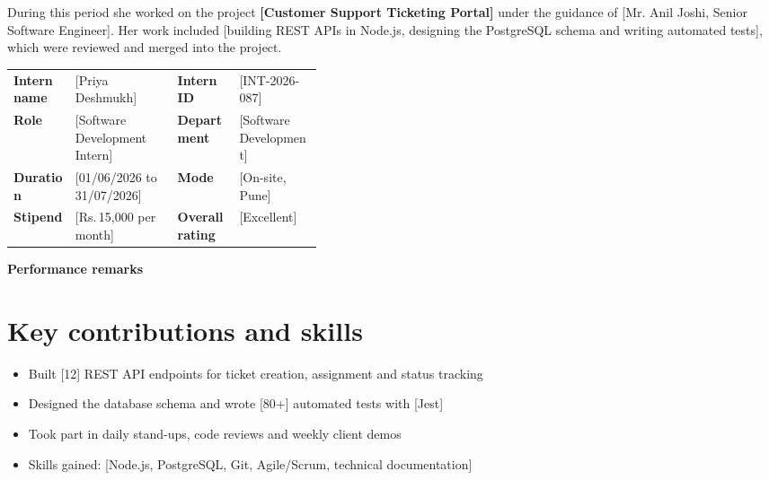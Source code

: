 \documentclass[10pt]{article}
\begin{document}
During this period she worked on the project \textbf{[Customer Support Ticketing Portal]} under the guidance of [Mr. Anil Joshi, Senior Software Engineer]. Her work included [building REST APIs in Node.js, designing the PostgreSQL schema and writing automated tests], which were reviewed and merged into the project.\par\vspace{4pt}

\begin{tabularx}{\linewidth}{@{}p{0.2\linewidth}X p{0.2\linewidth}X@{}}
\textbf{Intern name} & [Priya Deshmukh] & \textbf{Intern ID} & [INT-2026-087] \\
\textbf{Role} & [Software Development Intern] & \textbf{Department} & [Software Development] \\
\textbf{Duration} & [01/06/2026 to 31/07/2026] & \textbf{Mode} & [On-site, Pune] \\
\textbf{Stipend} & [Rs.\,15,000 per month] & \textbf{Overall rating} & [Excellent] \\
\end{tabularx}\par\vspace{2pt}

\noindent\colorbox{notebg}{\parbox{\dimexpr\linewidth-2\fboxsep}{\footnotesize {\color{accent}\bfseries Performance remarks}\\ [Priya was punctual, eager to learn and worked well with the team. She picked up new tools quickly, met her deadlines and communicated clearly with her mentor. Her conduct throughout the internship was very good.]}}\par\vspace{6pt}

\section{Key contributions and skills}

\begin{itemize}
  \item Built [12] REST API endpoints for ticket creation, assignment and status tracking
  \item Designed the database schema and wrote [80+] automated tests with [Jest]
  \item Took part in daily stand-ups, code reviews and weekly client demos
  \item Skills gained: [Node.js, PostgreSQL, Git, Agile/Scrum, technical documentation]
\end{itemize}
\end{document}
